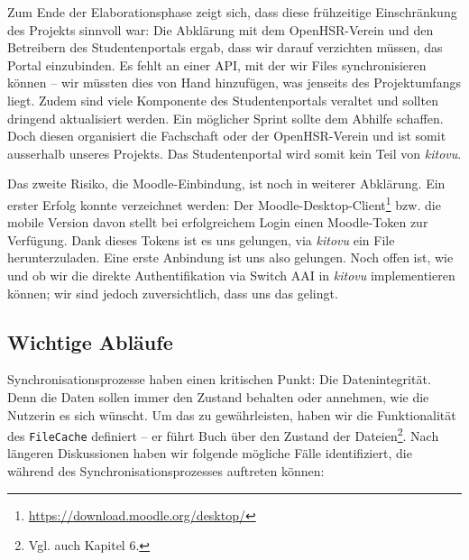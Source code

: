 \documentclass[a4paper]{article}
\begin{document}
Zum Ende der Elaborationsphase zeigt sich, dass diese frühzeitige Einschränkung des Projekts sinnvoll war: Die Abklärung mit dem OpenHSR-Verein und den Betreibern des Studentenportals ergab, dass wir darauf verzichten müssen, das Portal einzubinden. Es fehlt an einer API, mit der wir Files synchronisieren können -- wir müssten dies von Hand hinzufügen, was jenseits des Projektumfangs liegt. Zudem sind viele Komponente des Studentenportals veraltet und sollten dringend aktualisiert werden. Ein möglicher Sprint sollte dem Abhilfe schaffen. Doch diesen organisiert die Fachschaft oder der OpenHSR-Verein und ist somit ausserhalb unseres Projekts. Das Studentenportal wird somit kein Teil von \emph{kitovu}.

Das zweite Risiko, die Moodle-Einbindung, ist noch in weiterer Abklärung. Ein erster Erfolg konnte verzeichnet werden: Der Moodle-Desktop-Client\footnote{\url{https://download.moodle.org/desktop/}} bzw. die mobile Version davon stellt bei erfolgreichem Login einen Moodle-Token zur Verfügung. Dank dieses Tokens ist es uns gelungen, via \emph{kitovu} ein File herunterzuladen. Eine erste Anbindung ist uns also gelungen. Noch offen ist, wie und ob wir die direkte Authentifikation via Switch AAI in \emph{kitovu} implementieren können; wir sind jedoch zuversichtlich, dass uns das gelingt.

\subsection{Wichtige Abläufe}

Synchronisationsprozesse haben einen kritischen Punkt: Die Datenintegrität. Denn die Daten sollen immer den Zustand behalten oder annehmen, wie die Nutzerin es sich wünscht. Um das zu gewährleisten, haben wir die Funktionalität des \verb|FileCache| definiert -- er führt Buch über den Zustand der Dateien\footnote{Vgl. auch Kapitel 6.}. Nach längeren Diskussionen haben wir folgende mögliche Fälle identifiziert, die während des Synchronisationsprozesses auftreten können:
\end{document}
